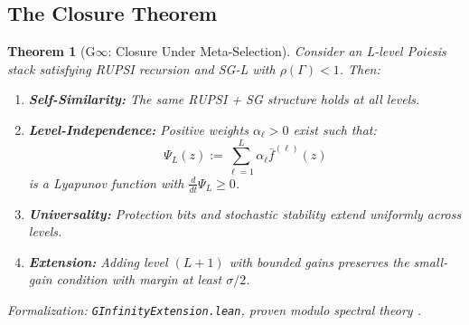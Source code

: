 \documentclass[12pt]{article}
\newtheorem{theorem}{Theorem}[section]
\begin{document}
\subsection{The Closure Theorem}

\begin{theorem}[G$\infty$: Closure Under Meta-Selection]
\label{thm:g-infinity}
Consider an L-level Poiesis stack satisfying RUPSI recursion and SG-L with $\rho(\Gamma) < 1$. Then:
\begin{enumerate}
    \item[(a)] \textbf{Self-Similarity:} The same RUPSI + SG structure holds at all levels.
    
    \item[(b)] \textbf{Level-Independence:} Positive weights $\alpha_\ell > 0$ exist such that:
    \[
    \Psi_L(z) := \sum_{\ell=1}^L \alpha_\ell \bar{f}^{(\ell)}(z)
    \]
    is a Lyapunov function with $\frac{d}{dt} \Psi_L \geq 0$.
    
    \item[(c)] \textbf{Universality:} Protection bits and stochastic stability extend uniformly across levels.
    
    \item[(d)] \textbf{Extension:} Adding level $(L+1)$ with bounded gains preserves the small-gain condition with margin at least $\sigma/2$.
\end{enumerate}
\end{theorem}
\noindent\textit{Formalization: \texttt{GInfinityExtension.lean}, proven modulo spectral theory \citep{horn2012matrix}.}
\end{document}
